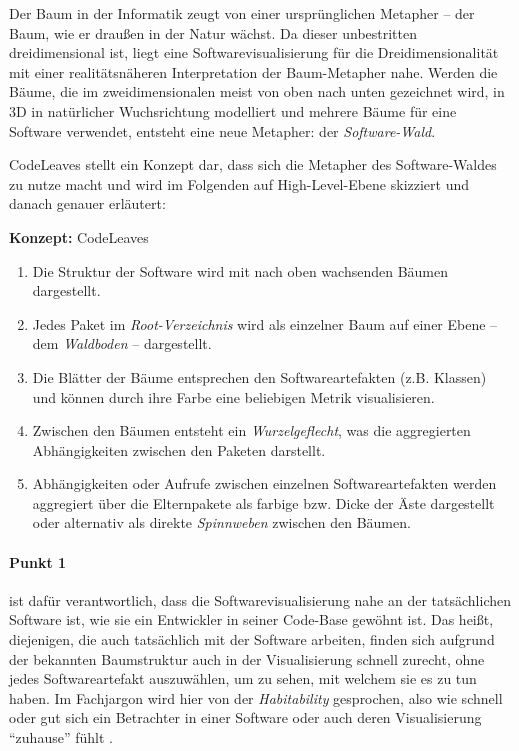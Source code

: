 Der Baum in der Informatik zeugt von einer ursprünglichen Metapher -- der Baum, wie er draußen in der Natur wächst. Da dieser unbestritten dreidimensional ist, liegt eine Softwarevisualisierung für die Dreidimensionalität mit einer realitätsnäheren Interpretation der Baum-Metapher nahe. Werden die Bäume, die im zweidimensionalen meist von oben nach unten gezeichnet wird, in 3D in natürlicher Wuchsrichtung modelliert und mehrere Bäume für eine Software verwendet, entsteht eine neue Metapher: der \emph{Software-Wald}.

CodeLeaves stellt ein Konzept dar, dass sich die Metapher des Software-Waldes zu nutze macht und wird im Folgenden auf High-Level-Ebene skizziert und danach genauer erläutert:

\begin{titlebox}{\textbf{Konzept:} CodeLeaves}
  \begin{enumerate}
    \item Die Struktur der Software wird mit nach oben wachsenden Bäumen dargestellt.
    \item Jedes Paket im \emph{Root-Verzeichnis} wird als einzelner Baum auf einer Ebene -- dem \emph{Waldboden} -- dargestellt.
    \item Die Blätter der Bäume entsprechen den Softwareartefakten (z.B. Klassen) und können durch ihre Farbe eine beliebigen Metrik visualisieren.
    \item Zwischen den Bäumen entsteht ein \emph{Wurzelgeflecht}, was die aggregierten Abhängigkeiten zwischen den Paketen darstellt.
    \item Abhängigkeiten oder Aufrufe zwischen einzelnen Softwareartefakten werden aggregiert über die Elternpakete als farbige bzw. Dicke der Äste dargestellt oder alternativ als direkte \emph{Spinnweben} zwischen den Bäumen.
  \end{enumerate}
\end{titlebox}

\paragraph{Punkt 1} ist dafür verantwortlich, dass die Softwarevisualisierung nahe an der tatsächlichen Software ist, wie sie ein Entwickler in seiner Code-Base gewöhnt ist. Das heißt, diejenigen, die auch tatsächlich mit der Software arbeiten, finden sich aufgrund der bekannten Baumstruktur auch in der Visualisierung schnell zurecht, ohne jedes Softwareartefakt auszuwählen, um zu sehen, mit welchem sie es zu tun haben. Im Fachjargon wird hier von der \emph{Habitability} gesprochen, also wie schnell oder gut sich ein Betrachter in einer Software oder auch deren Visualisierung "`zuhause"' fühlt \cite{wettel2007program}.

